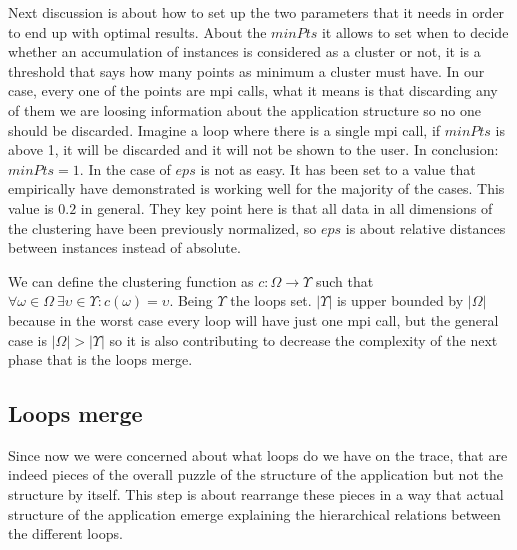 Next discussion is
about how to set up the two parameters that it needs in order to end up with
optimal results. About the $minPts$ it allows to set when to decide whether an
accumulation of instances is considered as a cluster or not, it is a threshold
that says how many points as minimum a cluster must have. In our case, every one
of the points are mpi calls, what it means is that discarding any of them we are
loosing information about the application structure so no one should be
discarded. Imagine a loop where there is a single mpi call, if $minPts$ is above
1, it will be discarded and it will not be shown to the user. In conclusion:
$minPts=1$. In the case of $eps$ is not as easy. It has been set to a value that
empirically have demonstrated is working well for the majority of the cases.
This value is $0.2$ in general.
They key point here is that all data in all dimensions of the clustering have been 
previously normalized, so $eps$ is about relative distances between instances
instead of absolute.

We can define the clustering function as $c : \Omega \rightarrow \Upsilon$ such
that $\forall \omega \in \Omega \medspace \exists \upsilon \in \Upsilon :
c(\omega) = \upsilon$. Being $\Upsilon$ the loops set. $|\Upsilon|$ is upper
bounded by $|\Omega|$ because in the worst case every loop will have just one
mpi call, but the general case is $|\Omega| > |\Upsilon|$ so it is also
contributing to decrease the complexity of the next phase that is the loops
merge. 

\subsection{Loops merge}\label{ss:loops_merge}

Since now we were concerned about what loops do we have on the trace, that are
indeed pieces of the overall puzzle of the structure of the application but not
the structure by itself. This step is about rearrange these pieces 
in a way that actual structure of the application emerge explaining the 
hierarchical relations between the different loops. 

